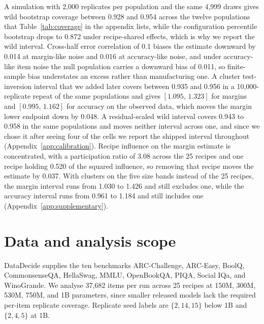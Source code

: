 \documentclass{article}
\newcommand{\ci}[2]{\ensuremath{[#1,\,#2]}}
\begin{document}
A simulation with 2,000 replicates per population and the same 4,999 draws gives wild bootstrap coverage between 0.928 and 0.954 across the twelve populations that Table~\ref{tab:coverage} in the appendix lists, while the configuration percentile bootstrap drops to 0.872 under recipe-shared effects, which is why we report the wild interval. Cross-half error correlation of 0.1 biases the estimate downward by 0.014 at margin-like noise and 0.016 at accuracy-like noise, and under accuracy-like item noise the null population carries a downward bias of 0.011, so finite-sample bias understates an excess rather than manufacturing one. A cluster test-inversion interval that we added later covers between 0.935 and 0.956 in a 10,000-replicate repeat of the same populations and gives \ci{1.095}{1.323} for margins and \ci{0.995}{1.162} for accuracy on the observed data, which moves the margin lower endpoint down by 0.048. A residual-scaled wild interval covers 0.943 to 0.958 in the same populations and moves neither interval across one, and since we chose it after seeing four of the cells we report the shipped interval throughout (Appendix~\ref{app:calibration}). Recipe influence on the margin estimate is concentrated, with a participation ratio of 3.08 across the 25 recipes and one recipe holding 0.520 of the squared influence, so removing that recipe moves the estimate by 0.037. With clusters on the five size bands instead of the 25 recipes, the margin interval runs from 1.030 to 1.426 and still excludes one, while the accuracy interval runs from 0.961 to 1.184 and still includes one (Appendix~\ref{app:supplementary}).

\section{Data and analysis scope}
DataDecide supplies the ten benchmarks ARC-Challenge, ARC-Easy, BoolQ, CommonsenseQA, HellaSwag, MMLU, OpenBookQA, PIQA, Social IQa, and WinoGrande. We analyse 37,682 items per run across 25 recipes at 150M, 300M, 530M, 750M, and 1B parameters, since smaller released models lack the required per-item replicate coverage. Replicate seed labels are $\{2,14,15\}$ below 1B and $\{2,4,5\}$ at 1B.
\end{document}
